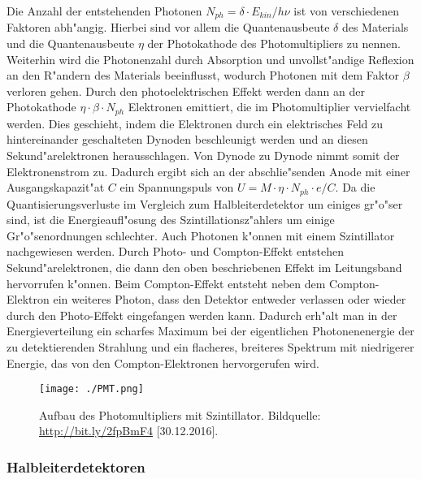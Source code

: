 \documentclass[12pt]{article}
\begin{document}
Die Anzahl der entstehenden Photonen $N_{ph}=\delta \cdot E_{kin}/h\nu$ ist von verschiedenen Faktoren abh"angig. Hierbei sind vor allem die Quantenausbeute $\delta$ des Materials und die Quantenausbeute $\eta$ der Photokathode des Photomultipliers zu nennen. Weiterhin wird die Photonenzahl durch Absorption und unvollst"andige Reflexion an den R"andern des Materials beeinflusst, wodurch Photonen mit dem Faktor $\beta$ verloren gehen. Durch den photoelektrischen Effekt werden dann an der Photokathode $\eta \cdot \beta \cdot N_{ph}$ Elektronen emittiert, die im Photomultiplier vervielfacht werden. Dies geschieht, indem die Elektronen durch ein elektrisches Feld zu hintereinander geschalteten Dynoden beschleunigt werden und an diesen Sekund"arelektronen herausschlagen. Von Dynode zu Dynode nimmt somit der Elektronenstrom zu. Dadurch ergibt sich an der abschlie"senden Anode mit einer Ausgangskapazit"at $C$ ein Spannungspuls von $U=M\cdot \eta \cdot N_{ph} \cdot e/C$. Da die Quantisierungsverluste im Vergleich zum Halbleiterdetektor um einiges gr"o"ser sind, ist die Energieaufl"osung des Szintillationsz"ahlers um einige Gr"o"senordnungen schlechter. Auch Photonen k"onnen mit einem Szintillator nachgewiesen werden. Durch Photo- und Compton-Effekt entstehen Sekund"arelektronen, die dann den oben beschriebenen Effekt im Leitungsband hervorrufen k"onnen. Beim Compton-Effekt entsteht neben dem Compton-Elektron ein weiteres Photon, dass den Detektor entweder verlassen oder wieder durch den Photo-Effekt eingefangen werden kann. Dadurch erh"alt man in der Energieverteilung ein scharfes Maximum bei der eigentlichen Photonenenergie der zu detektierenden Strahlung und ein flacheres, breiteres Spektrum mit niedrigerer Energie, das von den Compton-Elektronen hervorgerufen wird. 
\begin{center}
	\centering
	\begin{figure}[h]
		\centering
		\texttt{[image: ./PMT.png]}
		\caption[Szintillator]{Aufbau des Photomultipliers mit Szintillator. \newline Bildquelle: \url{http://bit.ly/2fpBmF4} [30.12.2016].}
		\label{fig:PMT}
	\end{figure}
\end{center}

\subsubsection{Halbleiterdetektoren}
\end{document}
